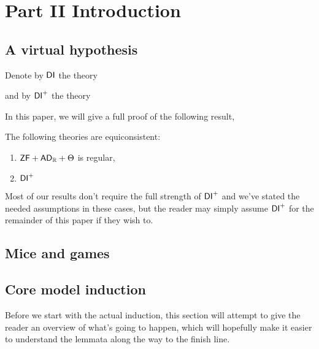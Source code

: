 \documentclass[../../main]{subfiles}
\begin{document}
\chapter{Part II Introduction}
\thispagestyle{fancy}


\section{A virtual hypothesis}


\qquad Denote by $\operatorname{\textsf{DI}}$ the theory

and by $\operatorname{\textsf{DI}}^+$ the theory

In this paper, we will give a full proof of the following result,

\begin{theorem}
  The following theories are equiconsistent:
  \begin{enumerate}
    \item $\textsf{ZF} + \textsf{AD}_{\mathbb{R}} + \Theta$ is regular,
    \item $\operatorname{\textsf{DI}}^+$
  \end{enumerate}
\end{theorem}

Most of our results don't require the full strength of $\operatorname{\textsf{DI}}^+$ and we've stated the needed assumptions in these cases, but the reader may simply assume $\operatorname{\textsf{DI}}^+$ for the remainder of this paper if they wish to.


\section{Mice and games}



\section{Core model induction}

Before we start with the actual induction, this section will attempt to give the reader an overview of what's going to happen, which will hopefully make it easier to understand the lemmata along the way to the finish line.
\end{document}
